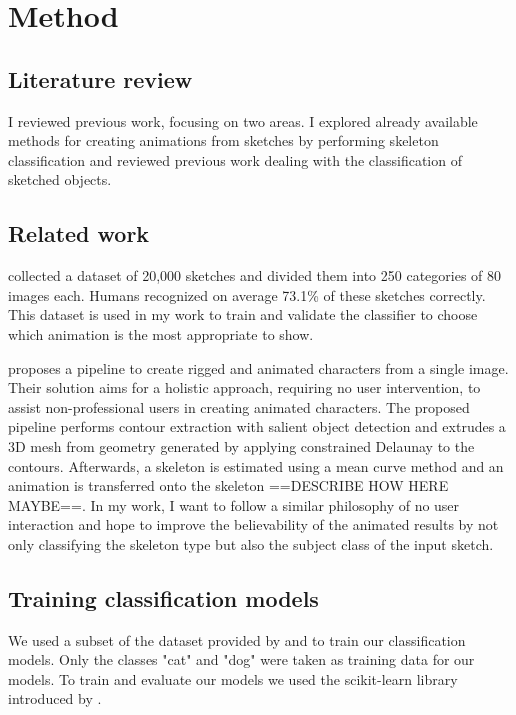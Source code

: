 \chapter{Method}
\label{ch:method}

\section*{Literature review}
I reviewed previous work, focusing on two areas. I explored already available
methods for creating animations from sketches by performing skeleton
classification and reviewed previous work dealing with the classification of
sketched objects.

\section*{Related work}
\textcite{eitz2012hdhso} collected a dataset of 20,000 sketches and divided them
into 250 categories of 80 images each. Humans recognized on average 73.1\% of 
these sketches correctly. This dataset is used in my work to train and validate
the classifier to choose which animation is the most appropriate to show.

\textcite{10.1145/3469877.3490565} proposes a pipeline to create rigged and
animated characters from a single image. Their solution aims for a holistic
approach, requiring no user intervention, to assist non-professional users in
creating animated characters. The proposed pipeline performs contour extraction
with salient object detection and extrudes a 3D mesh from geometry generated by
applying constrained Delaunay to the contours. Afterwards, a skeleton is
estimated using a mean curve method and an animation is transferred onto the
skeleton ==DESCRIBE HOW HERE MAYBE==. In my work, I want to follow a similar
philosophy of no user interaction and hope to improve the believability of the
animated results by not only classifying the skeleton type but also the subject
class of the input sketch.

\section*{Training classification models}
We used a subset of the dataset provided by \textcite{eitz2012hdhso} and
\textcite{10.1145/2897824.2925954} to train our classification models.
Only the classes "cat" and "dog" were taken as training data for our models. 
To train and evaluate our models we used the scikit-learn library introduced by
\textcite{scikit-learn}.

